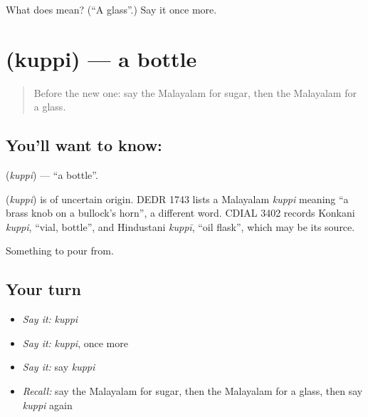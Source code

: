 \begin{tcolorbox}[breakable,colback=teal!4,colframe=teal!35!black,title={Before you move on}]
What does  mean? (\textquotedblleft{}A glass\textquotedblright{}.) Say it once more.
\end{tcolorbox}
\section[\texorpdfstring{\ml{കുപ്പി} (kuppi)}{കുപ്പി (kuppi)}]{ (kuppi) — a bottle}

\label{lesson:ML-C134-bottle}



\begin{quote}
Before the new one: say the Malayalam for sugar, then the Malayalam for a glass.
\end{quote}

\subsection*{You'll want to know: }
\textbf{} (\emph{kuppi}) — \textquotedblleft{}a bottle\textquotedblright{}.

\begin{cousinweb}
\textbf{} (\emph{kuppi}) is of uncertain origin. DEDR 1743 lists a Malayalam \emph{kuppi} meaning \textquotedblleft{}a brass knob on a bullock's horn\textquotedblright{}, a different word. CDIAL 3402 records Konkani \emph{kuppi}, \textquotedblleft{}vial, bottle\textquotedblright{}, and Hindustani \emph{kuppī}, \textquotedblleft{}oil flask\textquotedblright{}, which may be its source.
\end{cousinweb}

\begin{grammarlens}[title={What you've built}]
Something to pour from.
\end{grammarlens}

\subsection*{Your turn}
\begin{itemize}
\raggedright
  \item \emph{Say it:} \emph{kuppi}
  \item \emph{Say it:} \emph{kuppi}, once more
  \item \emph{Say it:} say \emph{kuppi}
  \item \emph{Recall:} say the Malayalam for sugar, then the Malayalam for a glass, then say \emph{kuppi} again
\end{itemize}

